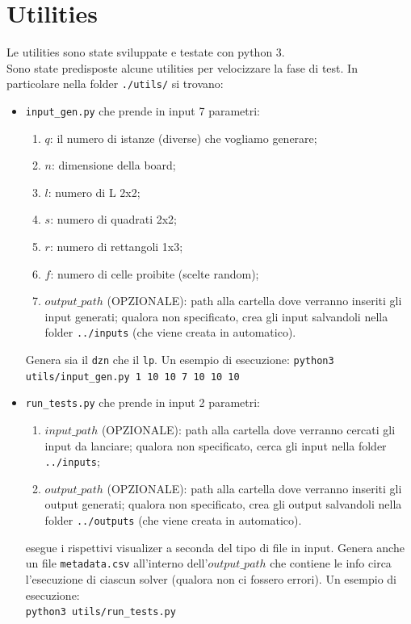 \documentclass{article}
\begin{document}
\section{Utilities}
Le utilities sono state sviluppate e testate con python 3.\\
Sono state predisposte alcune utilities per velocizzare la fase di test. In particolare nella folder \texttt{./utils/} si trovano:
\begin{itemize}
    \item \texttt{input\_gen.py} che prende in input 7 parametri:
          \begin{enumerate}
              \item $q$: il numero di istanze (diverse) che vogliamo generare;
              \item $n$: dimensione della board;
              \item $l$: numero di L 2x2;
              \item $s$: numero di quadrati 2x2;
              \item $r$: numero di rettangoli 1x3;
              \item $f$: numero di celle proibite (scelte random);
              \item $output\_path$ (OPZIONALE): path alla cartella dove verranno inseriti gli input generati; qualora non specificato, crea gli input salvandoli nella folder \texttt{../inputs} (che viene creata in automatico).
          \end{enumerate}
          Genera sia il \texttt{dzn} che il \texttt{lp}. Un esempio di esecuzione:
          \texttt{python3 utils/input\_gen.py 1 10 10 7 10 10 10} 
    \item \texttt{run\_tests.py} che prende in input 2 parametri:
          \begin{enumerate}
              \item $input\_path$ (OPZIONALE): path alla cartella dove verranno cercati gli input da lanciare; qualora non specificato, cerca gli input nella folder \texttt{../inputs};
              \item $output\_path$ (OPZIONALE): path alla cartella dove verranno inseriti gli output generati; qualora non specificato, crea gli output salvandoli nella folder \texttt{../outputs} (che viene creata in automatico).
          \end{enumerate}
          esegue i rispettivi visualizer a seconda del tipo di file in input. Genera anche un file \texttt{metadata.csv} all'interno dell'$output\_path$ che contiene le info circa l'esecuzione di ciascun solver (qualora non ci fossero errori). Un esempio di esecuzione:\\
          \texttt{python3 utils/run\_tests.py}
\end{itemize}
\end{document}
